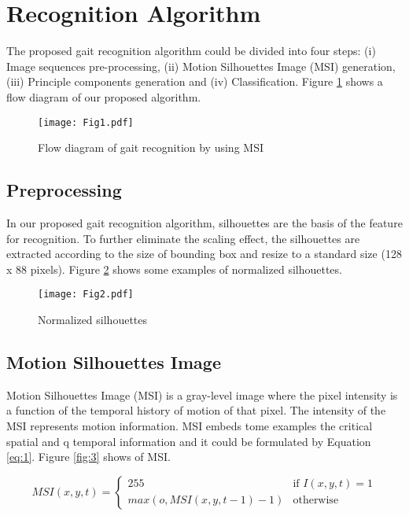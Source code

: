 \documentclass{style1}
\date{ }
\begin{document}
\tableofcontents
\newpage
\section{Recognition Algorithm}
The proposed gait recognition algorithm could be divided into four steps: (i) Image sequences pre-processing, (ii) Motion Silhouettes Image (MSI) generation, (iii) Principle components generation and (iv) Classification. Figure \ref{fig:1} shows a flow diagram of our proposed algorithm.

\begin{figure}[ht!]
\centering\texttt{[image: Fig1.pdf]}
\caption{Flow diagram of gait recognition by using MSI}
\label{fig:1}
\end{figure}
\subsection{Preprocessing}
In our proposed gait recognition algorithm, silhouettes are the basis of the feature for recognition. To further eliminate the scaling effect, the silhouettes are extracted according to the size of bounding box and resize to a standard size (128 x 88 pixels). Figure \ref{fig:2} shows some examples of normalized silhouettes. 

\begin{figure}[ht!]
\centering\texttt{[image: Fig2.pdf]}
\caption{Normalized silhouettes}
\label{fig:2}
\end{figure}
\subsection{Motion Silhouettes Image}
Motion Silhouettes Image (MSI) is a gray-level image where the pixel intensity is a function of the temporal history of motion of that pixel. The intensity of the MSI represents motion information. MSI embeds tome examples the critical spatial and q temporal information and it could be formulated by Equation \ref{eq:1}. Figure \ref{fig:3} shows of MSI.

\begin{equation}
MSI(x,y,t) = 
\begin{cases}
255 & \text{if } I(x,y,t) = 1\\
max(o,MSI(x,y,t-1) - 1) & \text{otherwise}
\end{cases}
\label{eq:1}
\end{equation}
\end{document}
